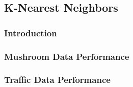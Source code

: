 \documentclass{article}
\begin{document}
\subsection{K-Nearest Neighbors}
\subsubsection{Introduction}
\subsubsection{Mushroom Data Performance}
\subsubsection{Traffic Data Performance}
\end{document}
